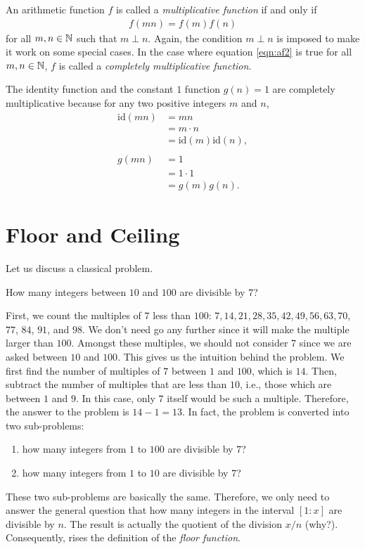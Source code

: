 \documentclass[12pt]{subfile}
\begin{document}
		\begin{definition}
			An arithmetic function $f$ is called a \textit{multiplicative function} if and only if 
				\begin{align}
				f(mn)=f(m)f(n)\label{eqn:af2}
				\end{align}
			for all $m,n\in\mathbb{N}$ such that $m\perp n$. Again, the condition $m\perp n$ is imposed to make it work on some special cases. In the case where equation \eqref{eqn:af2} is true for all $m,n\in\mathbb{N}$, $f$ is called a \textit{completely multiplicative function}.
		\end{definition}
		
		\begin{example}
			The identity function and the constant $1$ function $g(n)=1$ are completely multiplicative because for any two positive integers $m$ and $n$,
				\begin{align*}
					\text{id}(mn) &= mn \\
								  &= m \cdot n\\
								  &= \text{id}(m) \text{id}(n),\\
								  \\
							g(mn) &= 1\\
								  &= 1 \cdot 1\\
								  &= g(m)g(n).
				\end{align*}
		\end{example}
\section{Floor and Ceiling}
    Let us discuss a classical problem.
        \begin{problem} \label{floorproblem}
            How many integers between $10$ and $100$ are divisible by $7$?
        \end{problem}
    First, we count the multiples of $7$ less than $100$: $7, 14, 21, 28, 35, 42, 49, 56, 63, 70$, $77$, $84$, $91$, and $98$. We don't need go any further since it will make the multiple larger than $100$. Amongst these multiples, we should not consider $7$ since we are asked between $10$ and $100$. This gives us the intuition behind the problem. We first find the number of multiples of $7$ between $1$ and $100$, which is $14$. Then, subtract the number of multiples that are less than $10$, i.e., those which are between $1$ and $9$. In this case, only $7$ itself would be such a multiple. Therefore, the answer to the problem is $14-1=13$. In fact, the problem is converted into two sub-problems: 
    	\begin{enumerate}
    		\item how many integers from $1$ to $100$ are divisible by $7$?
    		\item how many integers from $1$ to $10$ are divisible by $7$? 
    	\end{enumerate}
    These two sub-problems are basically the same. Therefore, we only need to answer the general question that how many integers in the interval $[1:x]$ are divisible by $n$. The result is actually the quotient of the division $x/n$ (why?). Consequently, rises the definition of the \textit{floor function}.
    
\end{document}
